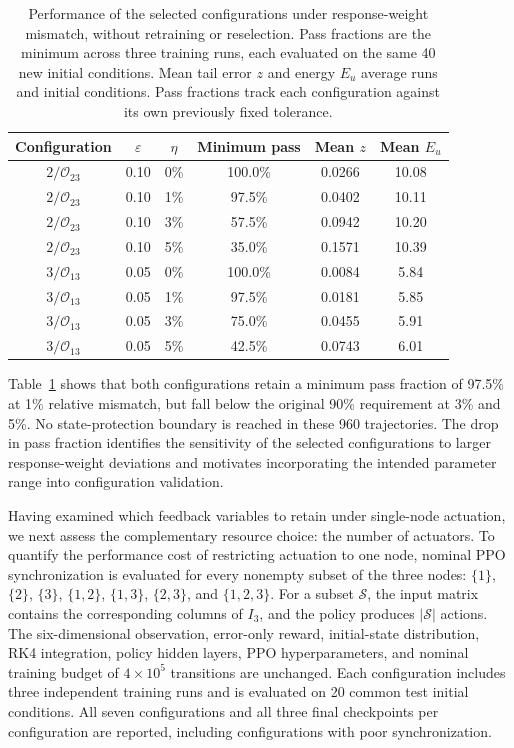 \documentclass[a4paper,fleqn]{cas-dc}
\theoremstyle{plain}
\theoremstyle{definition}
\begin{document}
\begin{table}[pos=!t,width=\textwidth]
\centering
\caption{Performance of the selected configurations under response-weight mismatch, without retraining or reselection. Pass fractions are the minimum across three training runs, each evaluated on the same 40 new initial conditions. Mean tail error $z$ and energy $E_u$ average runs and initial conditions. Pass fractions track each configuration against its own previously fixed tolerance.}
\label{tab:configuration_transfer}
\small
\begin{tabular}{cccccc}
\toprule
Configuration & $\varepsilon$ & $\eta$ & Minimum pass & Mean $z$ & Mean $E_u$\\
\midrule
$2/\mathcal O_{23}$ & 0.10 & 0\% & 100.0\% & 0.0266 & 10.08\\
$2/\mathcal O_{23}$ & 0.10 & 1\% & 97.5\% & 0.0402 & 10.11\\
$2/\mathcal O_{23}$ & 0.10 & 3\% & 57.5\% & 0.0942 & 10.20\\
$2/\mathcal O_{23}$ & 0.10 & 5\% & 35.0\% & 0.1571 & 10.39\\
$3/\mathcal O_{13}$ & 0.05 & 0\% & 100.0\% & 0.0084 & 5.84\\
$3/\mathcal O_{13}$ & 0.05 & 1\% & 97.5\% & 0.0181 & 5.85\\
$3/\mathcal O_{13}$ & 0.05 & 3\% & 75.0\% & 0.0455 & 5.91\\
$3/\mathcal O_{13}$ & 0.05 & 5\% & 42.5\% & 0.0743 & 6.01\\
\bottomrule
\end{tabular}
\end{table}

Table~\ref{tab:configuration_transfer} shows that both configurations retain a minimum pass fraction of 97.5\% at 1\% relative mismatch, but fall below the original 90\% requirement at 3\% and 5\%. No state-protection boundary is reached in these 960 trajectories. The drop in pass fraction identifies the sensitivity of the selected configurations to larger response-weight deviations and motivates incorporating the intended parameter range into configuration validation.


Having examined which feedback variables to retain under single-node actuation, we next assess the complementary resource choice: the number of actuators. To quantify the performance cost of restricting actuation to one node, nominal PPO synchronization is evaluated for every nonempty subset of the three nodes: $\{1\}$, $\{2\}$, $\{3\}$, $\{1,2\}$, $\{1,3\}$, $\{2,3\}$, and $\{1,2,3\}$. For a subset $\mathcal S$, the input matrix contains the corresponding columns of $I_3$, and the policy produces $|\mathcal S|$ actions. The six-dimensional observation, error-only reward, initial-state distribution, RK4 integration, policy hidden layers, PPO hyperparameters, and nominal training budget of $4\times10^5$ transitions are unchanged. Each configuration includes three independent training runs and is evaluated on 20 common test initial conditions. All seven configurations and all three final checkpoints per configuration are reported, including configurations with poor synchronization.
\end{document}
